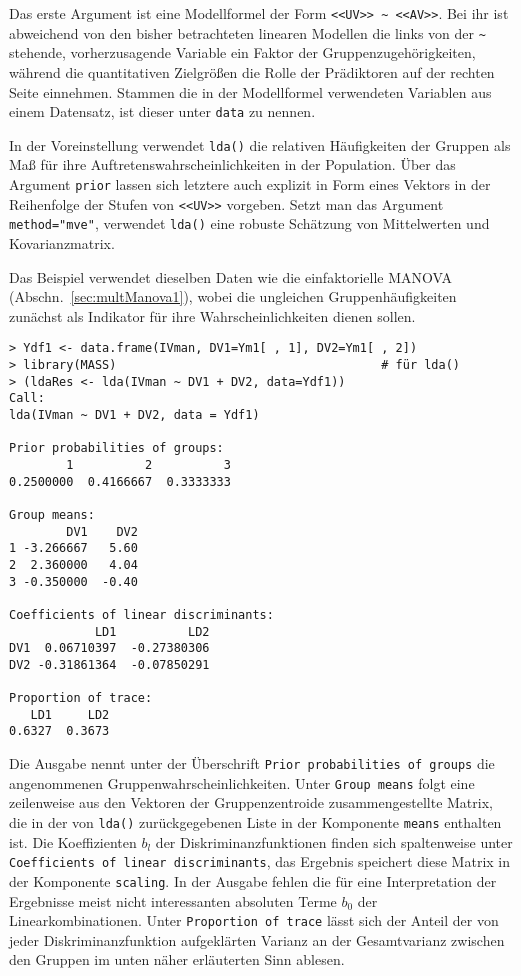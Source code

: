 Das erste Argument ist eine Modellformel der Form \lstinline!<<UV>> ~ <<AV>>!. Bei ihr ist abweichend von den bisher betrachteten linearen Modellen die links von der \lstinline!~! stehende, vorherzusagende Variable ein Faktor der Gruppenzugehörigkeiten, während die quantitativen Zielgrößen die Rolle der Prädiktoren auf der rechten Seite einnehmen. Stammen die in der Modellformel verwendeten Variablen aus einem Datensatz, ist dieser unter \lstinline!data! zu nennen.

In der Voreinstellung verwendet \lstinline!lda()! die relativen Häufigkeiten der Gruppen als Maß für ihre Auftretenswahrscheinlichkeiten in der Population. Über das Argument \lstinline!prior! lassen sich letztere auch explizit in Form eines Vektors in der Reihenfolge der Stufen von \lstinline!<<UV>>! vorgeben. Setzt man das Argument \lstinline!method="mve"!, verwendet \lstinline!lda()! eine robuste Schätzung von Mittelwerten und Kovarianzmatrix.

Das Beispiel verwendet dieselben Daten wie die einfaktorielle MANOVA (Abschn.\ \ref{sec:multManova1}), wobei die ungleichen Gruppenhäufigkeiten zunächst als Indikator für ihre Wahrscheinlichkeiten dienen sollen.
\begin{lstlisting}
> Ydf1 <- data.frame(IVman, DV1=Ym1[ , 1], DV2=Ym1[ , 2])
> library(MASS)                                     # für lda()
> (ldaRes <- lda(IVman ~ DV1 + DV2, data=Ydf1))
Call:
lda(IVman ~ DV1 + DV2, data = Ydf1)

Prior probabilities of groups:
        1          2          3
0.2500000  0.4166667  0.3333333

Group means:
        DV1    DV2
1 -3.266667   5.60
2  2.360000   4.04
3 -0.350000  -0.40

Coefficients of linear discriminants:
            LD1          LD2
DV1  0.06710397  -0.27380306
DV2 -0.31861364  -0.07850291

Proportion of trace:
   LD1     LD2
0.6327  0.3673
\end{lstlisting}

Die Ausgabe nennt unter der Überschrift \lstinline!Prior probabilities of groups! die angenommenen Gruppenwahrscheinlichkeiten. Unter \lstinline!Group means! folgt eine zeilenweise aus den Vektoren der Gruppenzentroide zusammengestellte Matrix, die in der von \lstinline!lda()! zurückgegebenen Liste in der Komponente \lstinline!means! enthalten ist. Die Koeffizienten $b_{l}$ der Diskriminanzfunktionen finden sich spaltenweise unter \lstinline!Coefficients of linear discriminants!, das Ergebnis speichert diese Matrix in der Komponente \lstinline!scaling!. In der Ausgabe fehlen die für eine Interpretation der Ergebnisse meist nicht interessanten absoluten Terme $b_{0}$ der Linearkombinationen. Unter \lstinline!Proportion of trace! lässt sich der Anteil der von jeder Diskriminanzfunktion aufgeklärten Varianz an der Gesamtvarianz zwischen den Gruppen im unten näher erläuterten Sinn ablesen.

